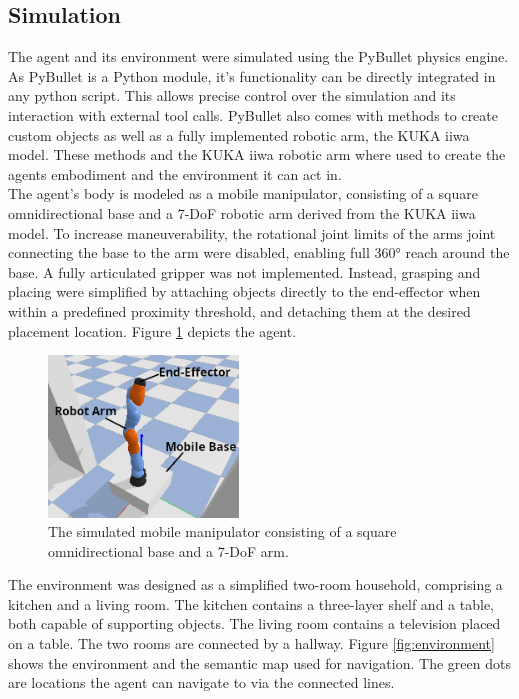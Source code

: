 \documentclass[../report.tex]{subfiles}
\begin{document}
\subsection{Simulation}
The agent and its environment were simulated using the PyBullet physics engine. As PyBullet is a Python module, it's functionality can be directly integrated in any python script. This allows precise control over the simulation and its interaction with external tool calls. PyBullet also comes with methods to create custom objects as well as a fully implemented robotic arm, the KUKA iiwa model. These methods and the KUKA iiwa robotic arm where used to create the agents embodiment and the environment it can act in. \\
The agent's body is modeled as a mobile manipulator, consisting of a square omnidirectional base and a 7-DoF robotic arm derived from the KUKA iiwa model.
To increase maneuverability, the rotational joint limits of the arms joint connecting the base to the arm were disabled, enabling full 360° reach around the base. A fully articulated gripper was not implemented. Instead, grasping and placing were simplified by attaching objects directly to the end-effector when within a predefined proximity threshold, and detaching them at the desired placement location. Figure \ref{fig:agent} depicts the agent.

\begin{figure}[h!]
	\centering
	\includegraphics[width=0.45\textwidth]{figures/agent.png}
	\caption{The simulated mobile manipulator consisting of a square omnidirectional base and a 7-DoF arm.}
	\label{fig:agent}
\end{figure}

The environment was designed as a simplified two-room household, comprising a kitchen and a living room. The kitchen contains a three-layer shelf and a table, both capable of supporting objects. The living room contains a television placed on a table. The two rooms are connected by a hallway. Figure \ref{fig:environment} shows the environment and the semantic map used for navigation. The green dots are locations the agent can navigate to via the connected lines.
\end{document}
